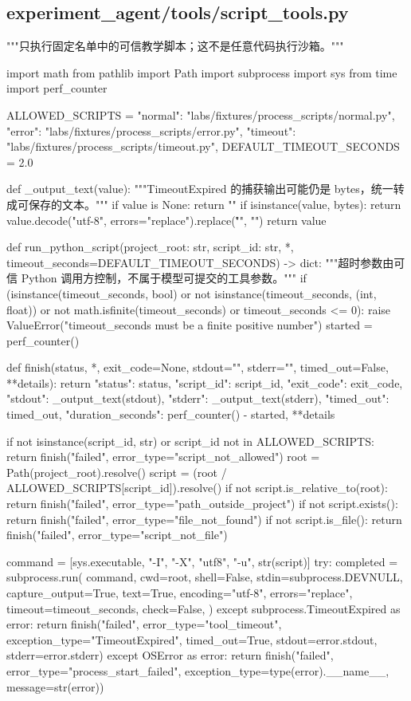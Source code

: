 \documentclass[UTF8,zihao=-4,fontset=fandol]{ctexart}
\begin{document}
\subsection{experiment\_agent/tools/script\_tools.py}

\begin{Code}
"""只执行固定名单中的可信教学脚本；这不是任意代码执行沙箱。"""

import math
from pathlib import Path
import subprocess
import sys
from time import perf_counter


ALLOWED_SCRIPTS = {
    "normal": "labs/fixtures/process_scripts/normal.py",
    "error": "labs/fixtures/process_scripts/error.py",
    "timeout": "labs/fixtures/process_scripts/timeout.py",
}
DEFAULT_TIMEOUT_SECONDS = 2.0


def _output_text(value):
    """TimeoutExpired 的捕获输出可能仍是 bytes，统一转成可保存的文本。"""
    if value is None:
        return ""
    if isinstance(value, bytes):
        return value.decode("utf-8", errors="replace").replace("\r\n", "\n")
    return value


def run_python_script(project_root: str, script_id: str, *, timeout_seconds=DEFAULT_TIMEOUT_SECONDS) -> dict:
    """超时参数由可信 Python 调用方控制，不属于模型可提交的工具参数。"""
    if (isinstance(timeout_seconds, bool) or not isinstance(timeout_seconds, (int, float))
            or not math.isfinite(timeout_seconds) or timeout_seconds <= 0):
        raise ValueError("timeout_seconds must be a finite positive number")
    started = perf_counter()

    def finish(status, *, exit_code=None, stdout="", stderr="", timed_out=False, **details):
        return {"status": status, "script_id": script_id, "exit_code": exit_code,
                "stdout": _output_text(stdout), "stderr": _output_text(stderr),
                "timed_out": timed_out, "duration_seconds": perf_counter() - started,
                **details}

    if not isinstance(script_id, str) or script_id not in ALLOWED_SCRIPTS:
        return finish("failed", error_type="script_not_allowed")
    root = Path(project_root).resolve()
    script = (root / ALLOWED_SCRIPTS[script_id]).resolve()
    if not script.is_relative_to(root):
        return finish("failed", error_type="path_outside_project")
    if not script.exists():
        return finish("failed", error_type="file_not_found")
    if not script.is_file():
        return finish("failed", error_type="script_not_file")

    command = [sys.executable, "-I", "-X", "utf8", "-u", str(script)]
    try:
        completed = subprocess.run(
            command, cwd=root, shell=False, stdin=subprocess.DEVNULL,
            capture_output=True, text=True, encoding="utf-8", errors="replace",
            timeout=timeout_seconds, check=False,
        )
    except subprocess.TimeoutExpired as error:
        return finish("failed", error_type="tool_timeout", exception_type="TimeoutExpired",
                      timed_out=True, stdout=error.stdout, stderr=error.stderr)
    except OSError as error:
        return finish("failed", error_type="process_start_failed",
                      exception_type=type(error).__name__, message=str(error))


\end{Code}
\end{document}
